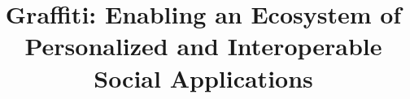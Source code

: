 \documentclass[sigconf,review,anonymous]{acmart}
\title{Graffiti: Enabling an Ecosystem of Personalized and Interoperable Social Applications}
\begin{document}
\begin{abstract}

\end{abstract}
\maketitle










\end{document}

